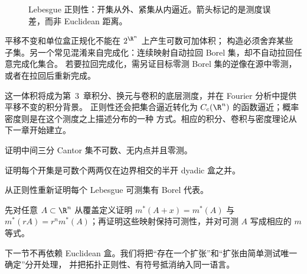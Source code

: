 \begin{figure}[htbp]
\centering
{}
\caption{Lebesgue 正则性：开集从外、紧集从内逼近。箭头标记的是测度误差，而非 Euclidean 距离。}
\label{fig:lebesgue-inner-outer-regularity}
\end{figure}

\begin{remark}
平移不变和单位盒正规化不能在 $2^{\R^n}$ 上产生可数可加体积；\Caratheodory{} 构造必须舍弃某些
子集。另一个常见混淆来自完成化：连续映射自动拉回 Borel 集，却不自动拉回任意完成化集合。
若要拉回完成化，需另证目标零测 Borel 集的逆像在源中零测，或者在拉回后重新完成。
\end{remark}

这一体积将成为第~3~章积分、换元与卷积的底层测度，并在 Fourier 分析中提供平移不变的积分背景。
正则性还会把集合逼近转化为 $C_c(\R^n)$ 的函数逼近；概率密度则是在这个测度之上描述分布的一种
方式。相应的积分、卷积与密度理论从下一章开始建立。

\begin{exercise}
证明中间三分 Cantor 集不可数、无内点并且零测。
\end{exercise}
\begin{exercise}
证明每个开集是可数个两两仅在边界相交的半开 dyadic 盒之并。
\end{exercise}
\begin{exercise}
从正则性重新证明每个 Lebesgue 可测集有 Borel 代表。
\end{exercise}
\begin{exercise}
先对任意 $A\subset\R^n$ 从覆盖定义证明
$m^*(A+x)=m^*(A)$ 与 $m^*(rA)=r^nm^*(A)$；再证明这些映射保持可测性，并对可测 $A$ 写成相应的
$m$ 等式。
\end{exercise}

下一节不再依赖 Euclidean 盒。我们将把“存在一个扩张”和“扩张由简单测试唯一确定”分开处理，
并把拓扑正则性、有符号抵消纳入同一语言。
\clearpage
\endgroup
